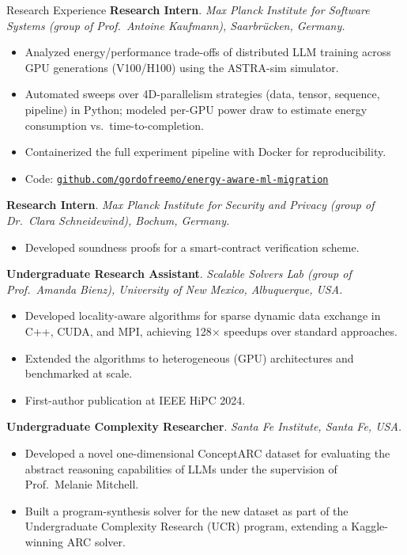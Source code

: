 \begin{rubric}{Research Experience}
\entry*[08/2025 -- 12/2025]%
    \textbf{Research Intern}. \emph{Max Planck Institute for Software Systems (group of Prof.\ Antoine Kaufmann), Saarbr\"ucken, Germany.}
    \begin{itemize}[leftmargin=*,noitemsep]
        \item Analyzed energy/performance trade-offs of distributed LLM training across GPU generations (V100/H100) using the ASTRA-sim simulator.
        \item Automated sweeps over 4D-parallelism strategies (data, tensor, sequence, pipeline) in Python; modeled per-GPU power draw to estimate energy consumption vs.\ time-to-completion.
        \item Containerized the full experiment pipeline with Docker for reproducibility.
        \item Code: \href{https://github.com/gordofreemo/energy-aware-ml-migration}{\texttt{github.com/gordofreemo/energy-aware-ml-migration}}
    \end{itemize}
\entry*[04/2025 -- 06/2025]%
    \textbf{Research Intern}. \emph{Max Planck Institute for Security and Privacy (group of Dr.\ Clara Schneidewind), Bochum, Germany.}
    \begin{itemize}[leftmargin=*,noitemsep]
        \item Developed soundness proofs for a smart-contract verification scheme.
    \end{itemize}
\entry*[01/2023 -- 05/2024]%
    \textbf{Undergraduate Research Assistant}. \emph{Scalable Solvers Lab (group of Prof.\ Amanda Bienz), University of New Mexico, Albuquerque, USA.}
    \begin{itemize}[leftmargin=*,noitemsep]
        \item Developed locality-aware algorithms for sparse dynamic data exchange in C++, CUDA, and MPI, achieving 128$\times$ speedups over standard approaches.
        \item Extended the algorithms to heterogeneous (GPU) architectures and benchmarked at scale.
        \item First-author publication at IEEE HiPC 2024.
    \end{itemize}
\entry*[06/2023 -- 08/2023]%
    \textbf{Undergraduate Complexity Researcher}. \emph{Santa Fe Institute, Santa Fe, USA.}
    \begin{itemize}[leftmargin=*,noitemsep]
        \item Developed a novel one-dimensional ConceptARC dataset for evaluating the abstract reasoning capabilities of LLMs under the supervision of Prof.\ Melanie Mitchell.
        \item Built a program-synthesis solver for the new dataset as part of the Undergraduate Complexity Research (UCR) program, extending a Kaggle-winning ARC solver.
    \end{itemize}
\end{rubric}
